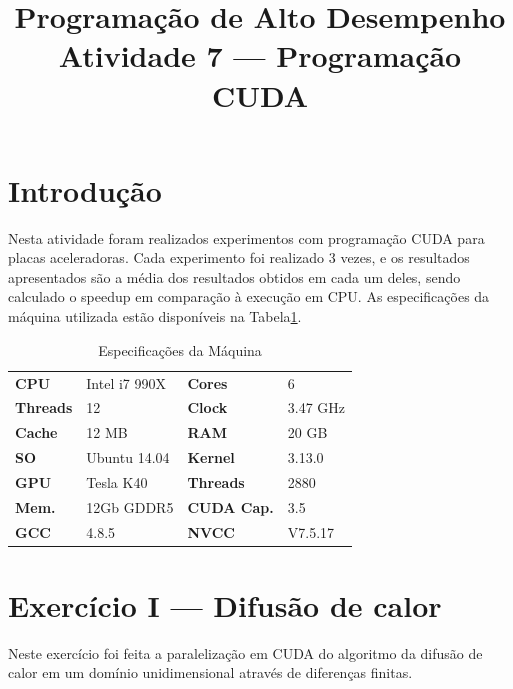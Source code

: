 \documentclass[conference]{IEEEtran}
\begin{document}
\title{Programação de Alto Desempenho\\
\large Atividade 7 --- Programação CUDA}

\author{
 }

\maketitle


\section{Introdução}
Nesta atividade foram realizados experimentos com programação CUDA para placas aceleradoras.
Cada experimento foi realizado 3 vezes, e os resultados apresentados são a média dos resultados obtidos em cada um deles, sendo calculado o speedup em comparação à execução em CPU.
As especificações da máquina utilizada estão disponíveis na Tabela\ref{tab:cpu}.

\begin{table}[htb!]
\centering
\begin{tabular}{ll|ll}
\bfseries CPU & Intel i7 990X & \bfseries Cores & 6\\
\bfseries Threads & 12 & \bfseries Clock & 3.47 GHz\\
\bfseries Cache& 12 MB  &\bfseries RAM & 20 GB \\
\bfseries SO & Ubuntu 14.04 & \bfseries Kernel & 3.13.0 \\
\bfseries GPU & Tesla K40 & \bfseries Threads & 2880 \\
\bfseries Mem. & 12Gb GDDR5 &\bfseries CUDA Cap. & 3.5 \\
\bfseries GCC & 4.8.5 & \bfseries NVCC & V7.5.17
\end{tabular}
\caption{Especificações da Máquina\label{tab:cpu}}
\end{table}

\section{Exercício I --- Difusão de calor\label{sec01}}
Neste exercício foi feita a paralelização em CUDA do algoritmo da difusão de calor em um domínio unidimensional através de diferenças finitas.
\end{document}
